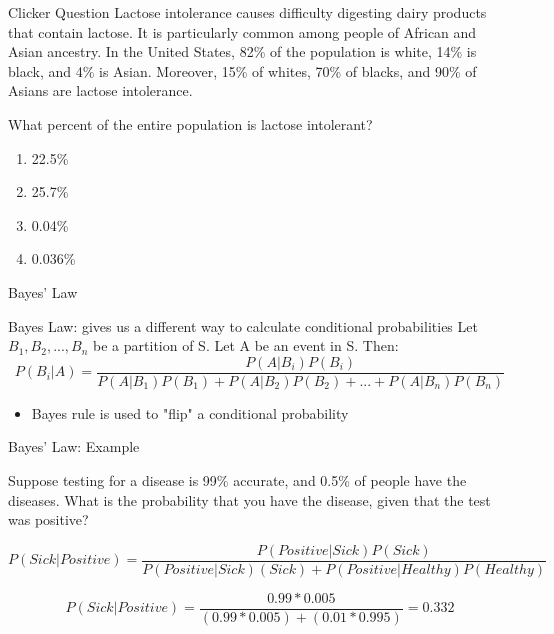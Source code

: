 \documentclass{beamer}
\begin{document}
\begin{frame}{Clicker Question}
	Lactose intolerance causes difficulty digesting dairy products that contain lactose. It is particularly common among people of African and Asian ancestry. In the United States, 82\% of the population is white, 14\% is black, and 4\% is Asian. Moreover, 15\% of whites, 70\% of blacks, and 90\% of Asians are lactose intolerance.
	
	What percent of the entire population is lactose intolerant? 
	
	\begin{enumerate}[label=(\alph*)]
		\item 22.5\%
		\item 25.7\%
		\item 0.04\%\
		\item 0.036\%
	\end{enumerate}
\end{frame}
\begin{frame}{Bayes' Law}
	
	\alert{Bayes Law}: gives us a different way to calculate conditional probabilities 
	Let $B_1, B_2, ..., B_n$ be a partition of S. Let A be an event in S. Then:
	$$P(B_i|A)=\frac{P(A|B_i)P(B_i)}{P(A|B_1)P(B_1)+P(A|B_2)P(B_2)+...+P(A|B_n)P(B_n)}$$
	\begin{itemize}
		\item Bayes rule is used to "flip" a conditional probability 
	\end{itemize}
	
\end{frame}

\begin{frame}{Bayes' Law: Example}
	
	Suppose testing for a disease is 99\% accurate, and 0.5\% of people have the diseases. What is the probability that you have the disease, given that the test was positive?
	
	\small{\[ 
		P(Sick \vert Positive) = \frac{P(Positive \vert Sick)P(Sick)}{P(Positive \vert Sick)(Sick) + P(Positive \vert Healthy)P(Healthy)}
	\]}
	
	\small{\[ 
		P(Sick \vert Positive)= \frac{0.99*0.005}{(0.99*0.005)+(0.01*0.995)} = 0.332
	\]}
	
\end{frame}
\end{document}
